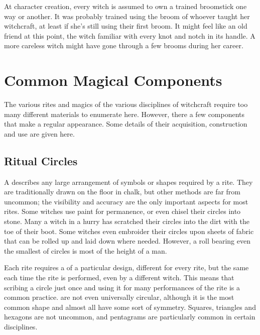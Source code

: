 At character creation, every witch is assumed to own a trained broomstick one way or another.
It was probably trained using the broom of whoever taught her witchcraft, at least if she's still using their first broom.
It might feel like an old friend at this point, the witch familiar with every knot and notch in its handle.
A more careless witch might have gone through a few brooms during her career.



\section{Common Magical Components}

The various rites and magics of the various disciplines of witchcraft require too many different materials to enumerate here.
However, there a few components that make a regular appearance.
Some details of their acquisition, construction and use are given here.

\subsection{Ritual Circles}

A  describes any large arrangement of symbols or shapes required by a rite.
They are traditionally drawn on the floor in chalk, but other methods are far from uncommon; the visibility and accuracy are the only important aspects for most rites.
Some witches use paint for permanence, or even chisel their circles into stone.
Many a witch in a hurry has scratched their circles into the dirt with the toe of their boot.
Some witches even embroider their circles upon sheets of fabric that can be rolled up and laid down where needed.
However, a roll bearing even the smallest of circles is most of the height of a man.

Each rite requires a  of a particular design, different for every rite, but the same each time the rite is performed, even by a different witch.
This means that scribing a circle just once and using it for many performances of the rite is a common practice.
 are not even universally circular, although it is the most common shape and almost all have some sort of symmetry.
Squares, triangles and hexagons are not uncommon, and pentagrams are particularly common in certain disciplines.

